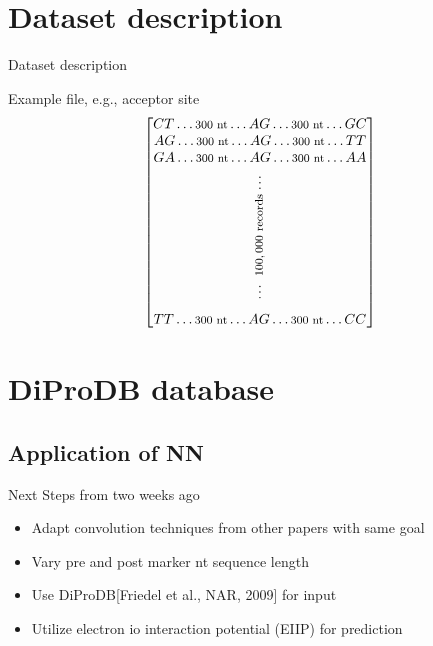 \documentclass[10pt]{beamer}
\begin{document}
\section{Dataset description}
\begin{frame}{Dataset description}
	
	\large Example file, e.g., acceptor site
	\begin{align*}
	\begin{bmatrix}
	CT \dots \rotatebox{0}{\footnotesize $ 300 $ nt} \dots AG \dots \rotatebox{0}{\footnotesize $ 300 $ nt} \dots GC\\
	AG \dots \rotatebox{0}{\footnotesize $ 300 $ nt} \dots AG \dots \rotatebox{0}{\footnotesize $ 300 $ nt} \dots TT \\
	GA \dots \rotatebox{0}{\footnotesize $ 300 $ nt} \dots AG \dots \rotatebox{0}{\footnotesize $ 300 $ nt} \dots AA \\[0.2ex]
	\vdots\\
	\rotatebox{90}{\footnotesize$ ~100,000 $ records} \\[-1.3ex]
	\vdots \\[1.4ex]
	TT \dots \rotatebox{0}{\footnotesize $ 300 $ nt} \dots AG \dots \rotatebox{0}{\footnotesize $ 300 $ nt} \dots CC
	\end{bmatrix}
	\end{align*}
\end{frame}

\section{DiProDB database}
\subsection{Application of NN}
\begin{frame}{Next Steps from two weeks ago}
	\begin{itemize}
		\item Adapt convolution techniques from other papers with same goal
		\item Vary pre and post marker nt sequence length
		\item Use DiProDB[Friedel et al., NAR, 2009] for input
		\item Utilize electron io interaction potential (EIIP) for prediction
	\end{itemize}
\end{frame}
\end{document}
